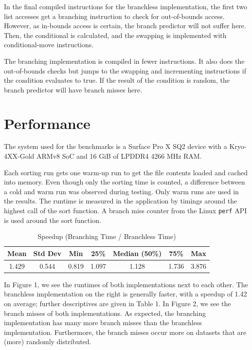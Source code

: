\documentclass[a4paper,10pt]{article}
\begin{document}
In the final compiled instructions for the branchless implementation, the 
first two list accesses get a branching instruction to check for out-of-bounds
access. However, as in-bounds access is certain, the branch predictor will not
suffer here. Then, the conditional is calculated, and the swapping is implemented
with conditional-move instructions.

The branching implementation is compiled in fewer instructions. It also does the
out-of-bounds checks but jumps to the swapping and incrementing instructions if the
condition evaluates to true. If the result of the condition is random, the branch
predictor will have branch misses here.

\section{Performance}

The system used for the benchmarks is a Surface Pro X SQ2 device 
with a Kryo-4XX-Gold ARMv8 SoC and 16 GiB of LPDDR4 4266 MHz RAM.

Each sorting run gets one warm-up run to get the file contents loaded
and cached into memory. Even though only the sorting time is counted, a
difference between a cold and warm run was observed during testing.
Only warm runs are used in the results. The runtime is measured in the
application by timings around the highest call of the sort function.
A branch miss counter from the Linux \texttt{perf} API is used around
the sort function.

\begin{table}[h!]
    \centering
    \caption{Speedup (Branching Time / Branchless Time)}
    \label{tab:speedup_descriptive}
    \begin{tabular}{ccccccc}
        \toprule
        Mean & Std Dev & Min & 25\% & Median (50\%) & 75\% & Max \\
        \midrule
        1.429 & 0.544 & 0.819 & 1.097 & 1.128 & 1.736 & 3.876 \\
        \bottomrule
    \end{tabular}
\end{table}

In Figure 1, we see the runtimes of both implementations next to each other. The branchless
implementation on the right is generally faster, with a speedup of 1.42 on average; further
descriptives are given in Table 1.
In Figure 2, we see the branch misses of both implementations. As expected, the branching 
implementation has many more branch misses than the branchless implementation. Furthermore,
the branch misses occur more on datasets that are (more) randomly distributed.
\end{document}
